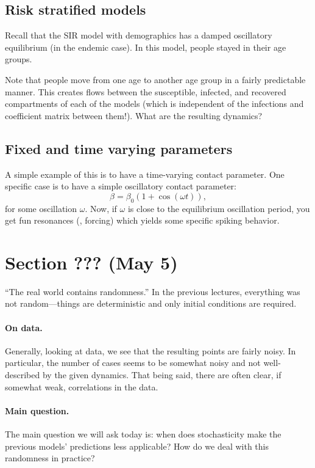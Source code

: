 \documentclass[12pt]{article}
\begin{document}
\subsection{Risk stratified models}
Recall that the SIR model with demographics has a damped oscillatory equilibrium (in the endemic case). In this model, people stayed in their age groups.

Note that people move from one age to another age group in a fairly predictable manner. This creates flows between the susceptible, infected, and recovered compartments of each of the models (which is independent of the infections and coefficient matrix between them!). What are the resulting dynamics?

\subsection{Fixed and time varying parameters}
A simple example of this is to have a time-varying contact parameter. One specific case is to have a simple oscillatory contact parameter:
\[
\beta = \beta_0(1 + \cos(\omega t)),
\]
for some oscillation $\omega$. Now, if $\omega$ is close to the equilibrium oscillation period, you get fun resonances (\eg, forcing) which yields some specific spiking behavior.

\section{Section ??? (May 5)}
``The real world contains randomness.'' In the previous lectures, everything was not random---things are deterministic and only initial conditions are required.

\paragraph{On data.} Generally, looking at data, we see that the resulting points are fairly noisy. In particular, the number of cases seems to be somewhat noisy and not well-described by the given dynamics. That being said, there are often clear, if somewhat weak, correlations in the data.

\paragraph{Main question.} The main question we will ask today is: when does stochasticity make the previous models' predictions less applicable? How do we deal with this randomness in practice?
\end{document}

